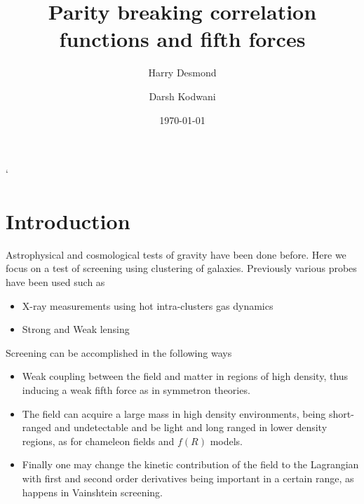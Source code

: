 \documentclass[aps,showpacs,onecolumn,floats,prd,superscriptaddress,nofootinbib]{revtex4-1}
\begin{document}
\title{\textbf{Parity breaking correlation functions and fifth forces}}

\author{Harry Desmond}
%

\author{Darsh Kodwani}
%

\date{\today}%
`
\begin{abstract}

\end{abstract}

\maketitle

\section{Introduction}

Astrophysical and cosmological tests of gravity have been done before. 
Here we focus on a test of screening using clustering of galaxies. 
Previously various probes have been used such as 

\begin{itemize}

\item X-ray measurements using hot intra-clusters gas dynamics
\item Strong and Weak lensing

\end{itemize}

Screening can be accomplished in the following ways

\begin{itemize}

\item Weak coupling between the field and matter in regions of high density, thus inducing a weak fifth force as in symmetron theories. 

\item The field can acquire a large mass in high density environments, being short-ranged and undetectable and be light and long ranged in lower density regions, as for chameleon fields and $f(R)$ models. 

\item Finally one may change the kinetic contribution of the field to the Lagrangian with first and second order derivatives being important in a certain range, as happens in Vainshtein screening. 

\end{itemize}
\end{document}
